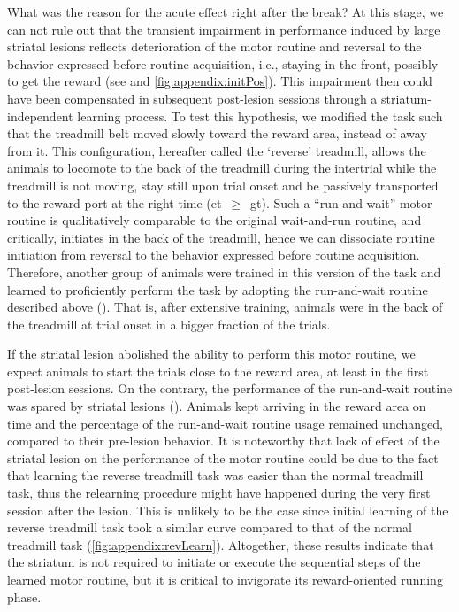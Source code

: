 What was the reason for the acute effect right after the break?
At this stage, we can not rule out that the transient impairment in performance induced by large striatal lesions reflects deterioration of the motor routine and reversal to the behavior expressed before routine acquisition, i.e., staying in the front, possibly to get the reward (see  and \autoref{fig:appendix:initPos}).
This impairment then could have been compensated in subsequent post-lesion sessions through a striatum-independent learning process.
To test this hypothesis, we modified the task such that the treadmill belt moved slowly toward the reward area, instead of away from it.
This configuration, hereafter called the `reverse' treadmill, allows the animals to locomote to the back of the treadmill during the intertrial while the treadmill is not moving, stay still upon trial onset and be passively transported to the reward port at the right time (\gls{et}~$\geq$~\gls{gt}).
Such a ``run-and-wait'' motor routine is qualitatively comparable to the original wait-and-run routine, and critically, initiates in the back of the treadmill, hence we can dissociate routine initiation from reversal to the behavior expressed before routine acquisition.
Therefore, another group of animals were trained in this version of the task and learned to proficiently perform the task by adopting the run-and-wait routine described above ().
That is, after extensive training, animals were in the back of the treadmill at trial onset in a bigger fraction of the trials.

If the striatal lesion abolished the ability to perform this motor routine, we expect animals to start the trials close to the reward area, at least in the first post-lesion sessions.
On the contrary, the performance of the run-and-wait routine was spared by striatal lesions ().
Animals kept arriving in the reward area on time and the percentage of the run-and-wait routine usage remained unchanged, compared to their pre-lesion behavior.
It is noteworthy that lack of effect of the striatal lesion on the performance of the motor routine could be due to the fact that learning the reverse treadmill task was easier than the normal treadmill task, thus the relearning procedure might have happened during the very first session after the lesion.
This is unlikely to be the case since initial learning of the reverse treadmill task took a similar curve compared to that of the normal treadmill task (\autoref{fig:appendix:revLearn}).
Altogether, these results indicate that the striatum is not required to initiate or execute the sequential steps of the learned motor routine, but it is critical to invigorate its reward-oriented running phase.



